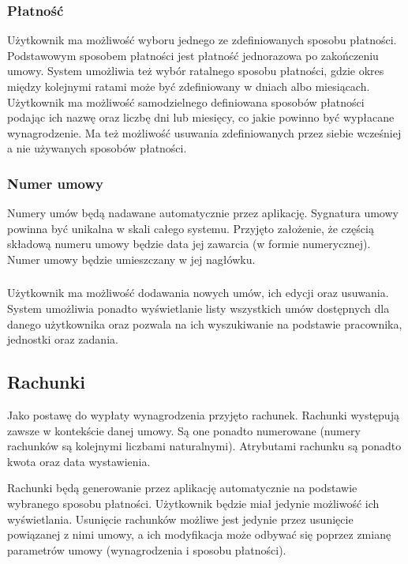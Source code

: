 \subsubsection{Płatność}
Użytkownik ma możliwość wyboru jednego ze zdefiniowanych sposobu płatności. Podstawowym sposobem płatności jest płatność jednorazowa po zakończeniu umowy. System umożliwia też wybór ratalnego sposobu płatności, gdzie okres między kolejnymi ratami może być zdefiniowany w dniach albo miesiącach. Użytkownik ma możliwość samodzielnego definiowana sposobów płatności podając ich nazwę oraz liczbę dni lub miesięcy, co jakie powinno być wypłacane wynagrodzenie. Ma też możliwość usuwania zdefiniowanych przez siebie wcześniej a nie używanych sposobów płatności. 

\subsubsection{Numer umowy}
Numery umów będą nadawane automatycznie przez aplikację. Sygnatura umowy powinna być unikalna w skali całego systemu. Przyjęto założenie, że częścią składową numeru umowy będzie data jej zawarcia (w formie numerycznej). Numer umowy będzie umieszczany w jej nagłówku.

\subsubsection{}
Użytkownik ma możliwość dodawania nowych umów, ich edycji oraz usuwania. System umożliwia ponadto wyświetlanie listy wszystkich umów dostępnych dla danego użytkownika oraz pozwala na ich wyszukiwanie na podstawie pracownika, jednostki oraz zadania.

\subsection[Rachunki][Rachunki]{Rachunki}
Jako postawę do wypłaty wynagrodzenia przyjęto rachunek. Rachunki występują zawsze w kontekście danej umowy. Są one ponadto numerowane (numery rachunków są kolejnymi liczbami naturalnymi). Atrybutami rachunku są ponadto kwota oraz data wystawienia.

Rachunki będą generowanie przez aplikację automatycznie na podstawie wybranego sposobu płatności. Użytkownik będzie miał jedynie możliwość ich wyświetlania. Usunięcie rachunków możliwe jest jedynie przez usunięcie powiązanej z nimi umowy, a ich modyfikacja może odbywać się poprzez zmianę parametrów umowy (wynagrodzenia i sposobu płatności).

